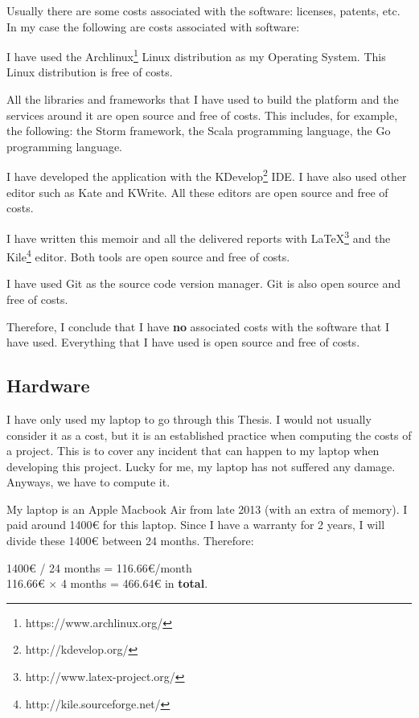 Usually there are some costs associated with the software: licenses, patents,
etc. In my case the following are costs associated with software:

\mylist
  \item I have used the Archlinux\footnote{https://www.archlinux.org/} Linux
distribution as my Operating System. This Linux distribution is free of costs.
  \item All the libraries and frameworks that I have used to build
the platform and the services around it are open source and free of costs. This
includes, for example, the following: the Storm framework, the Scala
programming language, the Go programming language.
  \item I have developed the application with
the KDevelop\footnote{http://kdevelop.org/} \ac{IDE}. I have also used other
editor such as Kate and KWrite. All these editors are open source and free of
costs.
  \item I have written this memoir and all the delivered reports with
\LaTeX{}\footnote{http://www.latex-project.org/} and the
Kile\footnote{http://kile.sourceforge.net/} editor. Both tools are open source
and free of costs.
  \item I have used Git as the source code version manager. Git is also open
source and free of costs.
\mylistend

Therefore, I conclude that I have {\bf no} associated costs with the software
that I have used. Everything that I have used is open source and free of costs.

\subsection{Hardware}

I have only used my laptop to go through this Thesis. I would not usually
consider it as a cost, but it is an established practice when computing the
costs of a project. This is to cover any incident that can happen to my laptop
when developing this project. Lucky for me, my laptop has not suffered any
damage. Anyways, we have to compute it.

My laptop is an Apple Macbook Air from late 2013 (with an extra of memory). I
paid around 1400\euro{} for this laptop. Since I have a warranty for 2 years, I
will divide these 1400\euro{} between 24 months. Therefore:

\begin{center}
  1400\euro{} / 24 months = 116.66\euro{}/month \\
  116.66\euro{} $\times$ 4 months = 466.64\euro{} in {\bf total}.
\end{center}


